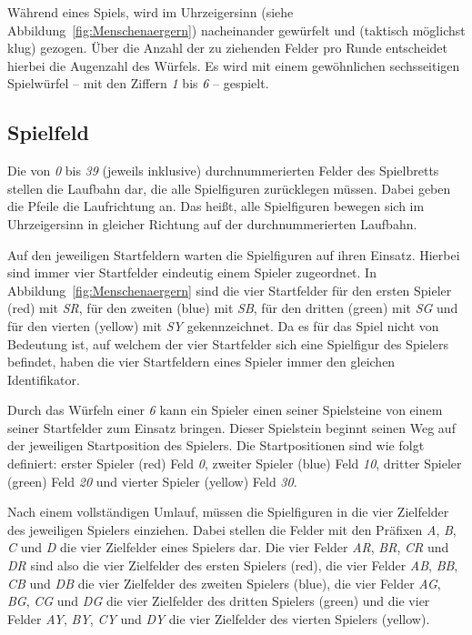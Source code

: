 \documentclass[
  name=\assignment,
  start=\releasedate,
  end=\duedate,
  subject=\lecture\,--\,\semester,
  group=\group,
  url=\theurl,
  author=\authors,
  mail=\themail
]{assignment}
\begin{document}
Während eines Spiels, wird im Uhrzeigersinn (siehe Abbildung~\ref{fig:Menschenaergern}) nacheinander gewürfelt und (taktisch möglichst klug) gezogen. Über die Anzahl der zu ziehenden Felder pro Runde entscheidet hierbei die Augenzahl des Würfels. Es wird mit einem gewöhnlichen sechsseitigen Spielwürfel -- mit den Ziffern \emph{1} bis \emph{6} -- gespielt.

\subsection*{Spielfeld}
Die von \emph{0} bis \emph{39} (jeweils inklusive) durchnummerierten Felder des Spielbretts stellen die Laufbahn dar, die alle Spielfiguren zurücklegen müssen. Dabei geben die Pfeile die Laufrichtung an. Das heißt, alle Spielfiguren bewegen sich im Uhrzeigersinn in gleicher Richtung auf der durchnummerierten Laufbahn.

Auf den jeweiligen Startfeldern warten die Spielfiguren auf ihren Einsatz. Hierbei sind immer vier Startfelder eindeutig einem Spieler zugeordnet. In Abbildung~\ref{fig:Menschenaergern} sind die vier Startfelder für den ersten Spieler (red) mit \emph{SR}, für den zweiten (blue) mit \emph{SB}, für den dritten (green) mit \emph{SG} und für den vierten (yellow) mit \emph{SY} gekennzeichnet. Da es für das Spiel nicht von Bedeutung ist, auf welchem der vier Startfelder sich eine Spielfigur des Spielers befindet, haben die vier Startfeldern eines Spieler immer den gleichen Identifikator.

Durch das Würfeln einer \emph{6} kann ein Spieler einen seiner Spielsteine von einem seiner Startfelder zum Einsatz bringen. Dieser Spielstein beginnt seinen Weg auf der jeweiligen Startposition des Spielers. Die Startpositionen sind wie folgt definiert: erster Spieler (red) Feld \emph{0}, zweiter Spieler (blue) Feld \emph{10}, dritter Spieler (green) Feld \emph{20} und vierter Spieler (yellow) Feld \emph{30}.

Nach einem vollständigen Umlauf, müssen die Spielfiguren in die vier Zielfelder des jeweiligen Spielers einziehen. Dabei stellen die Felder mit den Präfixen \emph{A}, \emph{B}, \emph{C} und \emph{D} die vier Zielfelder eines Spielers dar. Die vier Felder \emph{AR}, \emph{BR}, \emph{CR} und \emph{DR} sind also die vier Zielfelder des ersten Spielers (red), die vier Felder \emph{AB}, \emph{BB}, \emph{CB} und \emph{DB} die vier Zielfelder des zweiten Spielers (blue), die vier Felder \emph{AG}, \emph{BG}, \emph{CG} und \emph{DG} die vier Zielfelder des dritten Spielers (green) und die vier Felder \emph{AY}, \emph{BY}, \emph{CY} und \emph{DY} die vier Zielfelder des vierten Spielers (yellow).
\end{document}
